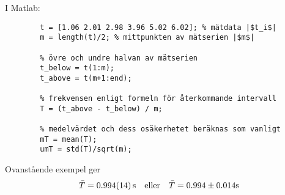\documentclass[9pt]{beamer}
\newcommand*\mean[1]{\bar{#1}}
\begin{document}
    \begin{frame}[fragile]
        I Matlab:
        \begin{verbatim}
        t = [1.06 2.01 2.98 3.96 5.02 6.02]; % mätdata |$t_i$|
        m = length(t)/2; % mittpunkten av mätserien |$m$|
        
        % övre och undre halvan av mätserien
        t_below = t(1:m);
        t_above = t(m+1:end);
        
        % frekvensen enligt formeln för återkommande intervall
        T = (t_above - t_below) / m;
        
        % medelvärdet och dess osäkerhetet beräknas som vanligt
        mT = mean(T);
        umT = std(T)/sqrt(m);
        \end{verbatim}

        \vfill
        Ovanstående exempel ger
        \begin{equation*}
            \mean{T} = \SI{0.994\pm0.014}{s} \quad \text{eller} \quad \mean{T} = 0.994\pm 0.014 \text{s}
        \end{equation*}
    \end{frame}

    
\end{document}
